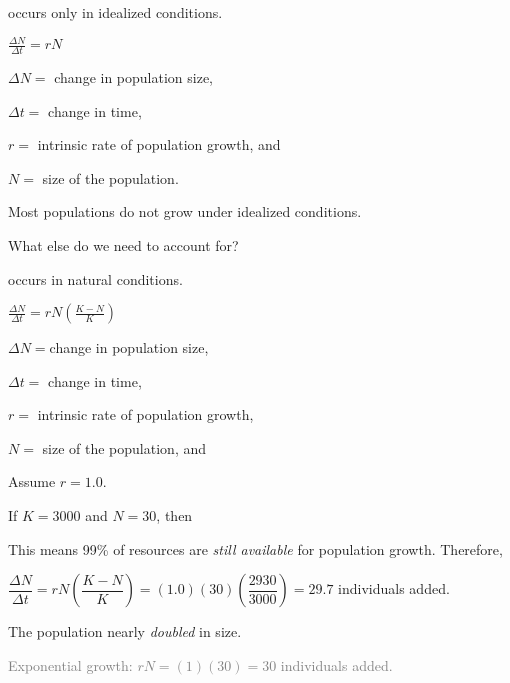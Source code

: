 \documentclass[t]{beamer}
\begin{document}
%
\begin{frame}{ occurs only in idealized conditions.}
	\begin{center}
		\Huge $\frac{\Delta N}{\Delta t} = rN$
	\end{center}
	
	\hangpara $\Delta N = $ change in population size,

	\hangpara $\Delta t = $ change in time,
	
	\hangpara $r = $ intrinsic rate of population growth, and
	
	\hangpara $N = $ size of the population.
	
\end{frame}
%
{
\begin{frame}[b]
\end{frame}
}
%
{
\begin{frame}[b]
\end{frame}
}
%
\begin{frame}{}

	\hangpara\Large Most populations do not grow under idealized conditions.
	
	\hangpara\Large What else do we need to account for?
	
	\pause
	\hangpara {}
	
\end{frame}
%
\begin{frame}{ occurs in natural conditions.}
	\begin{center}
		\Huge $\frac{\Delta N}{\Delta t} = rN\left(\frac{K-N}{K}\right)$
	\end{center}
	
	\hangpara $\Delta N = $change in population size,

	\hangpara $\Delta t = $ change in time,
	
	\hangpara $r = $ intrinsic rate of population growth, 
	
	\hangpara $N = $ size of the population, and
	
	\hangpara {}
	
\end{frame}
%
\begin{frame}
	\hangpara Assume $r = 1.0$.
	
	\hangpara If $K = 3000$ and $N = 30$, \pause then
	
	
	\hangpara This means 99\% of resources are \emph{still available} for population growth. \pause Therefore,
	
	\hangpara $\dfrac{\Delta N}{\Delta t} = rN\left(\dfrac{K-N}{K}\right) = (1.0)(30)\left(\dfrac{2930}{3000}\right) = 29.7$ individuals added. \pause
	
	\hangpara The population nearly \emph{doubled} in size.
	
	\hangpara \textcolor{gray}{Exponential growth: $rN = (1)(30) = 30$ individuals added.}
\end{frame}
\end{document}
